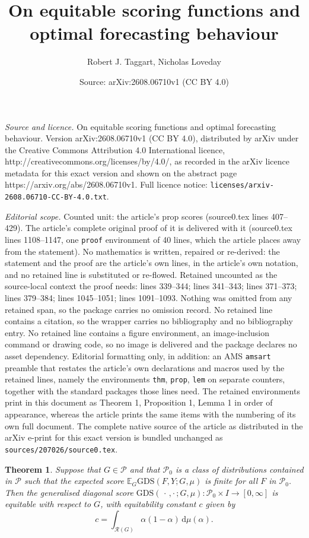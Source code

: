 \documentclass[10pt,a4paper]{amsart}
\title{On equitable scoring functions and optimal forecasting behaviour}
\author{Robert J. Taggart, Nicholas Loveday}
\date{Source: arXiv:2608.06710v1 (CC BY 4.0)}
\newtheorem{thm}{Theorem}
\newcommand{\EEE}{\mathbb{E}}
\newcommand{\GDS}{\mathrm{GDS}}
\newcommand{\RG}{\mathcal{R}(G)}
\newcommand{\dd}{\mathrm{d}}
\newcommand{\twocdots}{\,\cdot\,,\cdot\,}
\begin{document}
\maketitle

\noindent\emph{Source and licence.} On equitable scoring functions and optimal forecasting behaviour. Version arXiv:2608.06710v1 (CC BY 4.0), distributed by arXiv under the Creative Commons Attribution 4.0 International licence, http://creativecommons.org/licenses/by/4.0/, as recorded in the arXiv licence metadata for this exact version and shown on the abstract page https://arxiv.org/abs/2608.06710v1. Full licence notice: \texttt{licenses/arxiv-2608.06710-CC-BY-4.0.txt}.\par\smallskip

\noindent\textit{Editorial scope.} Counted unit: the article's prop scores (source0.tex lines 407--429). The article's complete original proof of it is delivered with it (source0.tex lines 1108--1147, one \texttt{proof} environment of 40 lines, which the article places away from the statement). No mathematics is written, repaired or re-derived: the statement and the proof are the article's own lines, in the article's own notation, and no retained line is substituted or re-flowed.  Retained uncounted as the source-local context the proof needs: lines 339--344; lines 341--343; lines 371--373; lines 379--384; lines 1045--1051; lines 1091--1093.  Nothing was omitted from any retained span, so the package carries no omission record.  No retained line contains a citation, so the wrapper carries no bibliography and no bibliography entry.  No retained line contains a figure environment, an image-inclusion command or drawing code, so no image is delivered and the package declares no asset dependency.  Editorial formatting only, in addition: an AMS \texttt{amsart} preamble that restates the article's own declarations and macros used by the retained lines, namely the environments \texttt{thm}, \texttt{prop}, \texttt{lem} on separate counters, together with the standard packages those lines need.  The retained environments print in this document as Theorem 1, Proposition 1, Lemma 1 in order of appearance, whereas the article prints the same items with the numbering of its own full document.  The complete native source of the article as distributed in the arXiv e-print for this exact version is bundled unchanged as \texttt{sources/207026/source0.tex}.
\begin{thm}\label{thm:GDS is equitable}
Suppose that $G\in\mathcal{P}$ and that $\mathcal{P}_0$ is a class of distributions contained in $\mathcal{P}$ such that the expected score $\EEE_G \GDS(F,Y;G,\mu)$ is finite for all $F$ in $\mathcal{P}_0$. Then the generalised diagonal score $\GDS(\twocdots ; G,\mu):\mathcal{P}_0\times I \to[0,\infty]$ is equitable with respect to $G$, with equitability constant $c$ given by
\begin{equation}\label{eq:GDS equitability constant}
c=\int_{\RG}\alpha(1-\alpha)\,\dd\mu(\alpha).
\end{equation}
\end{thm}
\end{document}
